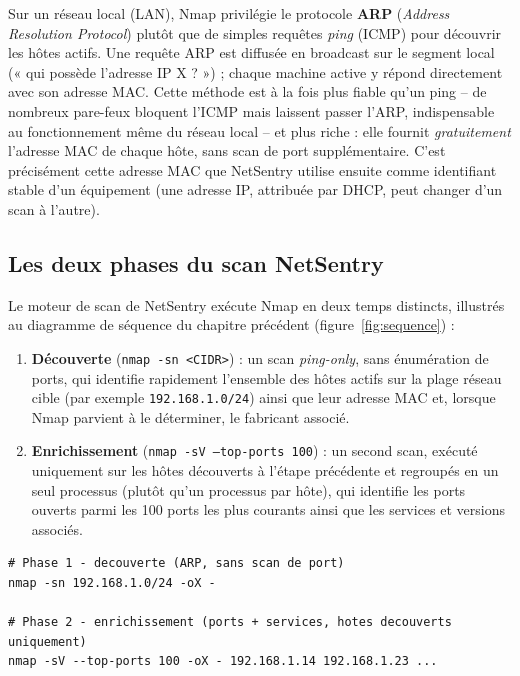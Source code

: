 Sur un réseau local (LAN), Nmap privilégie le protocole \textbf{ARP} (\textit{Address
Resolution Protocol}) plutôt que de simples requêtes \textit{ping} (ICMP) pour découvrir
les hôtes actifs. Une requête ARP est diffusée en broadcast sur le segment local
(« qui possède l'adresse IP X ? ») ; chaque machine active y répond directement avec son
adresse MAC. Cette méthode est à la fois plus fiable qu'un ping -- de nombreux pare-feux
bloquent l'ICMP mais laissent passer l'ARP, indispensable au fonctionnement même du
réseau local -- et plus riche : elle fournit \textit{gratuitement} l'adresse MAC de
chaque hôte, sans scan de port supplémentaire. C'est précisément cette adresse MAC que
NetSentry utilise ensuite comme identifiant stable d'un équipement (une adresse IP,
attribuée par DHCP, peut changer d'un scan à l'autre).

\subsection{Les deux phases du scan NetSentry}

Le moteur de scan de NetSentry exécute Nmap en deux temps distincts, illustrés au
diagramme de séquence du chapitre précédent (figure~\ref{fig:sequence}) :

\begin{enumerate}
    \item \textbf{Découverte} (\texttt{nmap -sn <CIDR>}) : un scan \textit{ping-only},
    sans énumération de ports, qui identifie rapidement l'ensemble des hôtes actifs sur
    la plage réseau cible (par exemple \texttt{192.168.1.0/24}) ainsi que leur adresse
    MAC et, lorsque Nmap parvient à le déterminer, le fabricant associé.
    \item \textbf{Enrichissement} (\texttt{nmap -sV --top-ports 100}) : un second scan,
    exécuté uniquement sur les hôtes découverts à l'étape précédente et regroupés en un
    seul processus (plutôt qu'un processus par hôte), qui identifie les ports ouverts
    parmi les 100 ports les plus courants ainsi que les services et versions associés.
\end{enumerate}

\begin{lstlisting}[caption={Exemple des deux commandes Nmap exécutées par NetSentry},label={lst:nmap-cmd}]
# Phase 1 - decouverte (ARP, sans scan de port)
nmap -sn 192.168.1.0/24 -oX -

# Phase 2 - enrichissement (ports + services, hotes decouverts uniquement)
nmap -sV --top-ports 100 -oX - 192.168.1.14 192.168.1.23 ...
\end{lstlisting}

